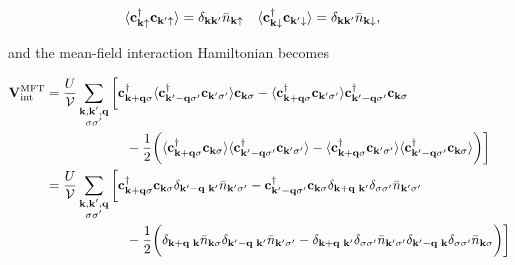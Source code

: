 \documentclass{homework}
\begin{document}
\begin{align}
    \langle {\bf c}_{{\bf k}\uparrow}^\dagger {\bf c}_{{\bf k}'\uparrow} \rangle &= \delta_{{\bf k} {\bf k}'} \bar{n}_{{\bf k} \uparrow} & \langle {\bf c}_{{\bf k}\downarrow}^\dagger {\bf c}_{{\bf k}'\downarrow} \rangle &= \delta_{{\bf k} {\bf k}'} \bar{n}_{{\bf k} \downarrow}, 
\end{align}

and the mean-field interaction Hamiltonian becomes 

\begin{align*}
    {\bf V}_{\textnormal{int}}^{\textnormal{MFT}} &= \frac{U}{\mathcal{V}} \sum_{\substack{{\bf k}, {\bf k}', {\bf q} \\
          {\sigma \sigma'}}} \bigg[ {\bf c}_{{\bf k + q}\sigma}^\dagger \langle {\bf c}_{{\bf k'-q}\sigma'}^\dagger {\bf c}_{{\bf k}'\sigma'} \rangle {\bf c}_{{\bf k}\sigma} - \langle {\bf c}_{{\bf k + q}\sigma}^\dagger {\bf c}_{{\bf k}'\sigma'} \rangle {\bf c}_{{\bf k'-q}\sigma'}^\dagger {\bf c}_{{\bf k}\sigma}  \\
          &  \blanky \blanky \blanky \blanky \blanky \blanky \blanky \blanky \blanky \blanky \blanky \blanky \blanky \blanky \blanky \blanky \blanky \blanky   -\frac{1}{2} \bigg( \langle {\bf c}_{{\bf k + q}\sigma}^\dagger {\bf c}_{{\bf k}\sigma} \rangle \langle {\bf c}_{{\bf k' - q}\sigma'}^\dagger {\bf c}_{{\bf k}'\sigma'} \rangle - \langle {\bf c}_{{\bf k + q}\sigma}^\dagger {\bf c}_{{\bf k}'\sigma'} \rangle \langle {\bf c}_{{\bf k' - q}\sigma'}^\dagger {\bf c}_{{\bf k}\sigma} \rangle  \bigg)  \bigg] \\
          &= \frac{U}{\mathcal{V}} \sum_{\substack{{\bf k}, {\bf k}', {\bf q} \\
          {\sigma \sigma'}}} 
          \bigg[ {\bf c}_{{\bf k + q}\sigma}^\dagger {\bf c}_{{\bf k}\sigma} \delta_{{\bf k'-q} \blanky {\bf k}'} \bar{n}_{{\bf k'} \sigma'} - {\bf c}_{{\bf k'-q}\sigma'}^\dagger {\bf c}_{{\bf k}\sigma} \delta_{{\bf k+q} \blanky {\bf k}'} \delta_{\sigma \sigma'} \bar{n}_{{\bf k}' \sigma'} \\
          & \blanky \blanky \blanky \blanky \blanky \blanky \blanky \blanky \blanky \blanky \blanky \blanky \blanky \blanky \blanky \blanky \blanky \blanky  - \frac{1}{2} \bigg(\delta_{{\bf k+q} \blanky {\bf k}} \bar{n}_{{\bf k} \sigma} \delta_{{\bf k'-q} \blanky {\bf k}'} \bar{n}_{{\bf k}' \sigma'} - \delta_{{\bf k+q} \blanky {\bf k}'} \delta_{\sigma \sigma'} \bar{n}_{{\bf k}' \sigma'} \delta_{{\bf k'-q} \blanky {\bf k}} \delta_{\sigma \sigma'} \bar{n}_{{\bf k} \sigma} \bigg) \bigg] \\

\end{align*}
\end{document}
